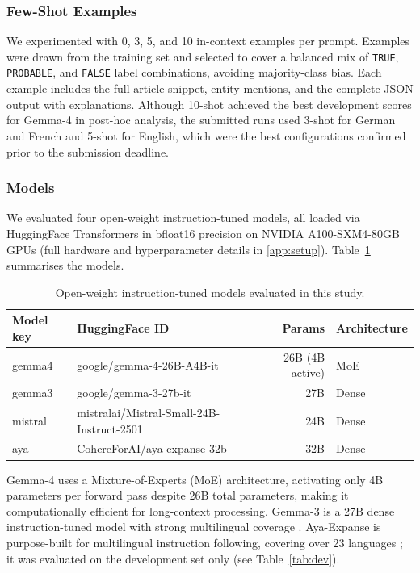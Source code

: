 \documentclass[
]{ceurart}
\theoremstyle{definition}
\begin{document}
\subsubsection{Few-Shot Examples}

We experimented with 0, 3, 5, and 10 in-context examples per prompt.
Examples were drawn from the training set and selected to cover a balanced mix of \texttt{TRUE}, \texttt{PROBABLE}, and \texttt{FALSE} label combinations, avoiding majority-class bias.
Each example includes the full article snippet, entity mentions, and the complete JSON output with explanations.
Although 10-shot achieved the best development scores for Gemma-4 in post-hoc analysis, the submitted runs used 3-shot for German and French and 5-shot for English, which were the best configurations confirmed prior to the submission deadline.

\subsubsection{Models}

We evaluated four open-weight instruction-tuned models, all loaded via HuggingFace Transformers in bfloat16 precision on NVIDIA A100-SXM4-80GB GPUs (full hardware and hyperparameter details in \ref{app:setup}). Table~\ref{tab:models} summarises the models.

\begin{table}[t]
\centering
\caption{Open-weight instruction-tuned models evaluated in this study.}
\label{tab:models}
\begin{tabular}{llrl}
\toprule
\textbf{Model key} & \textbf{HuggingFace ID} & \textbf{Params} & \textbf{Architecture} \\
\midrule
gemma4   & google/gemma-4-26B-A4B-it                  & 26B (4B active) & MoE   \\
gemma3   & google/gemma-3-27b-it                      & 27B             & Dense \\
mistral  & mistralai/Mistral-Small-24B-Instruct-2501  & 24B             & Dense \\
aya      & CohereForAI/aya-expanse-32b                & 32B             & Dense \\
\bottomrule
\end{tabular}
\end{table}

Gemma-4 uses a Mixture-of-Experts (MoE) architecture, activating only 4B parameters per forward pass despite 26B total parameters, making it computationally efficient for long-context processing.
Gemma-3 is a 27B dense instruction-tuned model with strong multilingual coverage \citep{team2025gemma3}.
Aya-Expanse is purpose-built for multilingual instruction following, covering over 23 languages \citep{ustun-etal-2024-aya}; it was evaluated on the development set only (see Table~\ref{tab:dev}).
\end{document}
